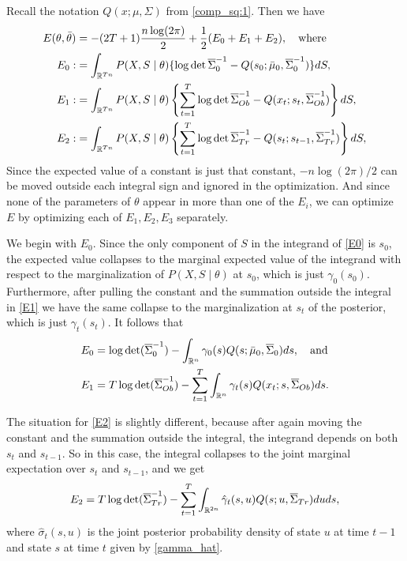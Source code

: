 \documentclass[12pt,leqno]{article}
\begin{document}
  
Recall the notation $Q(x;\mu,\Sigma)$ from \eqref{comp_sq:1}.  Then we have
\begin{align}
  E(\theta,\bar{\theta}) &= -(2T+1)\frac{n\log(2\pi)}{2} + \frac{1}{2}(E_0 + E_1 + E_2),\quad\text{where}\notag\\
  E_0 :&=\int_{{\mathbb R}^{Tn}}P(X,S\mid\theta)\{\log\det\overline{\Sigma}^{-1}_0 - Q(s_0;\bar{\mu}_0,\overline{\Sigma}_0^{-1})\}dS,\label{E0}\\
  E_1 :&= \int_{{\mathbb R}^{Tn}}P(X,S\mid\theta)\left\{\sum_{t=1}^T\log\det\overline{\Sigma}^{-1}_{Ob} - Q(x_t;s_t,\overline{\Sigma}_{Ob}^{-1})\right\}dS,
\label{E1}\\
  E_2 :&= \int_{{\mathbb R}^{Tn}}P(X,S\mid\theta)\left\{\sum_{t=1}^T\log\det\overline{\Sigma}^{-1}_{Tr} - Q(s_t;s_{t-1},\overline{\Sigma}_{Tr}^{-1})\right\}dS,
\label{E2}
\end{align}
Since the expected value of a constant is just that constant, $-n\log(2\pi)/2$ can be moved outside each
integral sign and ignored in the optimization.  And since none of the parameters of $\theta$ appear in more
than one of the $E_i$, we can optimize $E$ by optimizing each of $E_1,E_2,E_3$ separately.

We begin with $E_0$. Since the only component of $S$ in the integrand of \eqref{E0} is $s_0$, the expected value
collapses to the marginal 
expected value of the integrand with respect to the marginalization of $P(X,S\mid\theta)$ at $s_0$, which is just 
$\gamma_0(s_0)$.  Furthermore, after pulling the constant and the summation 
outside the integral in \eqref{E1} we have the same collapse to the marginalization at $s_t$ of the posterior, which
is just $\gamma_t(s_t)$.  It follows that
\begin{align*}
E_0 &= \log\det(\overline{\Sigma}^{-1}_0) - \int_{{\mathbb R}^n}\gamma_0(s)Q(s;\bar{\mu}_0,\overline{\Sigma}_0)ds,\quad\text{and}\\
E_1 &= T\log\det(\overline{\Sigma}^{-1}_{Ob}) - \sum_{t=1}^T\int_{{\mathbb R}^n}\gamma_t(s)Q(x_t;s,\overline{\Sigma}_{Ob})ds.
\end{align*}

The situation for \eqref{E2} is slightly different, because after again moving the constant and the summation outside
the integral, the integrand depends on both $s_t$ and $s_{t-1}$.  So in this case, the integral collapses to the 
joint marginal expectation over $s_t$ and $s_{t-1}$, and we get
$$
E_2 = T\log\det(\overline{\Sigma}^{-1}_{Tr}) - \sum_{t=1}^T\int_{{\mathbb R}^{2n}}\hat{\gamma}_t(s,u)Q(s;u,\overline{\Sigma}_{Tr})duds,
$$
where $\hat{\sigma}_t(s,u)$ is the joint posterior probability density of state $u$ at time $t-1$ and state $s$ 
at time $t$ given by \eqref{gamma_hat}.
\end{document}
